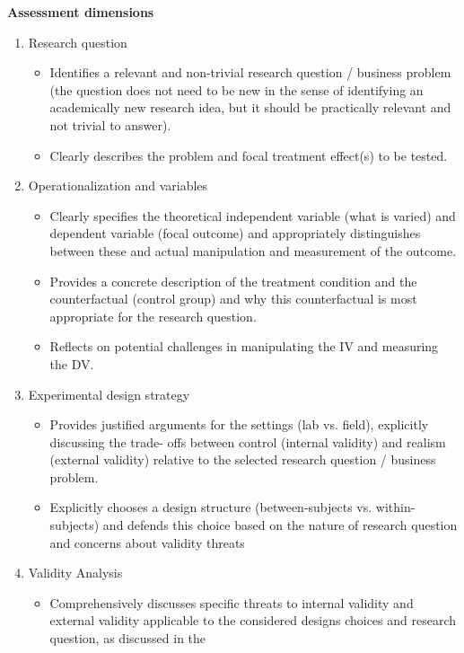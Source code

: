 \documentclass[10pt]{article}
\begin{document}
\textbf{Assessment dimensions}
\begin{enumerate}
    \item Research question
    \begin{itemize}
        \item Identifies a relevant and non-trivial research question / business problem (the question
        does not need to be new in the sense of identifying an academically new research idea,
        but it should be practically relevant and not trivial to answer).
        \item Clearly describes the problem and focal treatment effect(s) to be tested.
    \end{itemize}
    \item Operationalization and variables
    \begin{itemize}
        \item Clearly specifies the theoretical independent variable (what is varied) and dependent
        variable (focal outcome) and appropriately distinguishes between these and actual
        manipulation and measurement of the outcome.
        \item Provides a concrete description of the treatment condition and the counterfactual
        (control group) and why this counterfactual is most appropriate for the research
        question.
        \item Reflects on potential challenges in manipulating the IV and measuring the DV.
    \end{itemize}
    \item Experimental design strategy
    \begin{itemize}
        \item Provides justified arguments for the settings (lab vs. field), explicitly discussing the trade-
        offs between control (internal validity) and realism (external validity) relative to the
        selected research question / business problem.
        \item Explicitly chooses a design structure (between-subjects vs. within-subjects) and defends
        this choice based on the nature of research question and concerns about validity threats
    \end{itemize}
    \item Validity Analysis
    \begin{itemize}
        \item Comprehensively discusses specific threats to internal validity and external validity
        applicable to the considered designs choices and research question, as discussed in the

\end{itemize}
\end{enumerate}
\end{document}
